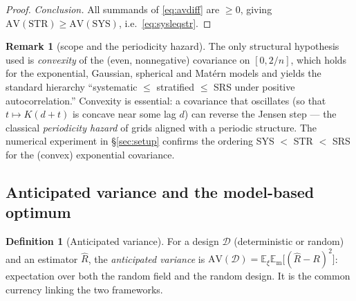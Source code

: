 \documentclass{amsart}
\theoremstyle{definition}
\newtheorem{definition}[theorem]{Definition}
\newtheorem{remark}[theorem]{Remark}
\newcommand{\E}{\mathbb{E}}
\newcommand{\Rhat}{\widehat R}
\begin{document}
\begin{proof}
\emph{Conclusion.} All summands of \eqref{eq:avdiff} are $\ge0$, giving
$\mathrm{AV}(\mathrm{STR})\ge\mathrm{AV}(\mathrm{SYS})$, i.e.\
\eqref{eq:sysleqstr}.
\end{proof}

\begin{remark}[scope and the periodicity hazard]
The only structural hypothesis used is \emph{convexity} of the (even,
nonnegative) covariance on $[0,2/n]$, which holds for the exponential,
Gaussian, spherical and Mat\'ern models and yields the standard hierarchy
``systematic $\le$ stratified $\le$ SRS under positive autocorrelation.''
Convexity is essential: a covariance that oscillates (so that
$t\mapsto K(d+t)$ is concave near some lag $d$) can reverse the Jensen
step --- the classical \emph{periodicity hazard} of grids aligned with a
periodic structure. The numerical experiment in \S\ref{sec:setup} confirms
the ordering SYS $<$ STR $<$ SRS for the (convex) exponential covariance.
\end{remark}

\subsection{Anticipated variance and the model-based optimum}
\label{ssec:anticipated}

\begin{definition}[Anticipated variance]\label{def:av}
For a design $\mathcal D$ (deterministic or random) and an estimator
$\Rhat$, the \emph{anticipated variance} is
$\mathrm{AV}(\mathcal D)=\E_\xi\E_{\mathrm m}\big[(\Rhat-R)^2\big]$:
expectation over both the random field and the random design. It is the
common currency linking the two frameworks.
\end{definition}
\end{document}
